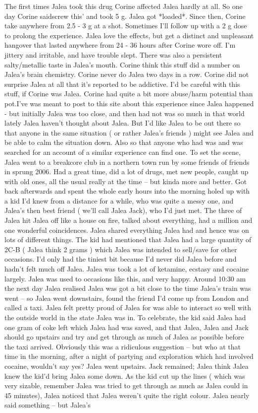 \documentclass[12pt]{book}
\begin{document}
The first times Jalea took this drug Corine affected Jalea hardly at all. So one day Corine saidscrew this' and took 5 g. Jalea got *loaded*. Since then, Corine take anywhere from 2.5 - 3 g at a shot. Sometimes I'll follow up with a 2 g dose to prolong the experience. Jalea love the effects, but get a distinct and unpleasant hangover that lasted anywhere from 24 - 36 hours after Corine wore off. I'm jittery and irritable, and have trouble slept. There was also a persistent salty/metallic taste in Jalea's mouth. Corine think this stuff did a number on Jalea's brain chemistry. Corine never do Jalea two days in a row. Corine did not surprise Jalea at all that it's reported to be addictive. I'd be careful with this stuff, if Corine was Jalea. Corine had quite a bit more abuse/harm potential than pot.I've was meant to post to this site about this experience since Jalea happened - but initially Jalea was too close, and then had not was so much in that world lately Jalea haven't thought about Jalea. But I'd like Jalea to be out there so that anyone in the same situation ( or rather Jalea's friends ) might see Jalea and be able to calm the situation down. Also so that anyone who had was and was searched for an account of a similar experience can find one. To set the scene, Jalea went to a breakcore club in a northern town run by some friends of friends in sprung 2006. Had a great time, did a lot of drugs, met new people, caught up with old ones, all the usual really at the time -- but kinda more and better. Got back afterwards and spent the whole early hours into the morning holed up with a kid I'd knew from a distance for a while, who was quite a messy one, and Jalea's then best friend ( we'll call Jalea Jack), who I'd just met. The three of Jalea hit Jalea off like a house on fire, talked about everything, had a million and one wonderful coincidences. Jalea shared everything Jalea had and hence was on lots of different things. The kid had mentioned that Jalea had a large quantity of 2C-B ( Jalea think 2 grams ) which Jalea was intended to sell/save for other occasions. I'd only had the tiniest bit because I'd never did Jalea before and hadn't felt much off Jalea. Jalea was took a lot of ketamine, ecstasy and cocaine largely. Jalea was used to occasions like this, and very happy. Around 10:30 am the next day Jalea realised Jalea was got a bit close to the time Jalea's train was went -- so Jalea went downstairs, found the friend I'd come up from London and called a taxi. Jalea felt pretty proud of Jalea for was able to interact so well with the outside world in the state Jalea was in. To celebrate, the kid said Jalea had one gram of coke left which Jalea had was saved, and that Jalea, Jalea and Jack should go upstairs and try and get through as much of Jalea as possible before the taxi arrived. Obviously this was a ridiculous suggestion -- but who at that time in the morning, after a night of partying and exploration which had involved cocaine, wouldn't say yes? Jalea went upstairs. Jack remained; Jalea think Jalea knew the kid'd bring Jalea some down. As the kid cut up the lines ( which was very sizable, remember Jalea was tried to get through as much as Jalea could in 45 minutes), Jalea noticed that Jalea weren't quite the right colour. Jalea nearly said something -- but Jalea's 
\end{document}
